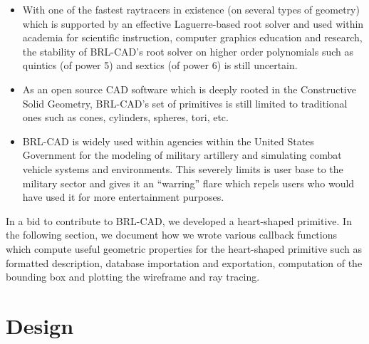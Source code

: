 \begin{itemize}
\item With   one   of   the   fastest   ray­tracers   in   existence   (on   several   types   of  
geometry)   which   is   supported   by   an   effective   Laguerre-­based   root   solver  
and   used   within   academia   for   scientific   instruction,   computer   graphics  
education   and   research,   the   stability   of   BRL­-CAD's   root   solver   on  
higher ­order   polynomials   such   as   quintics   (of   power   5)   and   sextics   (of  
power 6) is still uncertain.

\item As   an   open   source   CAD   software   which   is   deeply   rooted   in   the  
Constructive   Solid   Geometry,   BRL-­CAD's   set   of   primitives   is   still   limited  
to traditional ones such as cones, cylinders, spheres, tori, etc.

\item BRL­-CAD   is   widely   used   within   agencies   within   the   United   States  
Government   for   the   modeling   of   military   artillery   and   simulating   combat  vehicle   systems   and   environments.   This   severely   limits   is   user   base   to  the   military   sector   and   gives   it   an   “­warring”   flare   which   repels   users   who  would have used it for more entertainment purposes.
\end{itemize}

In   a   bid   to contribute to BRL-CAD, we developed   a   heart-­shaped   primitive. In   the   following   section,   we  
document   how   we   wrote   various   callback   functions   which   compute   useful  
geometric   properties   for   the   heart-­shaped   primitive   such   as   formatted  
description,   database   importation   and   exportation,   computation   of   the   bounding  
box and plotting the wireframe and ray tracing.


\section{Design}

